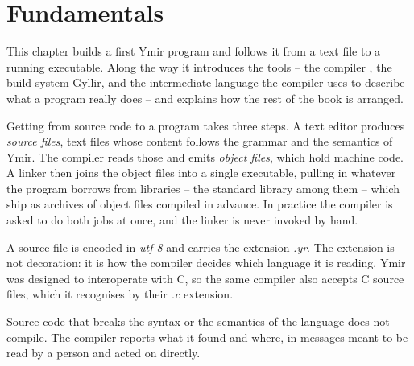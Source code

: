 \chapter{Fundamentals}
\label{chap:basics}

This chapter builds a first Ymir program and follows it from a text file to a
running executable. Along the way it introduces the tools -- the compiler
, the build system Gyllir, and the intermediate language the compiler
uses to describe what a program really does -- and explains how the rest of the
book is arranged.

\minitoc%

Getting from source code to a program takes three steps. A text editor produces
\emph{source files}, text files whose content follows the grammar and the
semantics of Ymir. The compiler reads those and emits \emph{object files}, which
hold machine code. A linker then joins the object files into a single executable,
pulling in whatever the program borrows from libraries -- the standard library
among them -- which ship as archives of object files compiled in advance. In
practice the compiler is asked to do both jobs at once, and the linker is never
invoked by hand.


\vfill%
\pagebreak%
          
A source file is encoded in \textit{utf-8} and carries the extension
\textit{.yr}. The extension is not decoration: it is how the compiler decides
which language it is reading. Ymir was designed to interoperate with C, so the
same compiler also accepts C source files, which it recognises by their
\textit{.c} extension.

Source code that breaks the syntax or the semantics of the language does not
compile. The compiler reports what it found and where, in messages meant to be
read by a person and acted on directly.
\vfill%
      






